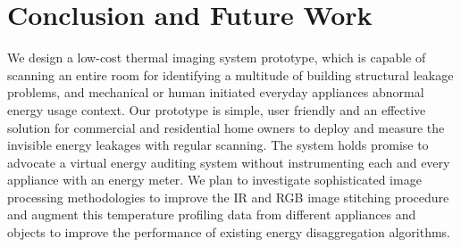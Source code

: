 \section{Conclusion and Future Work}
\label{sec:concl}

We design a low-cost thermal imaging system prototype, {\IRLeak}  which is capable of scanning an entire room for identifying a multitude of building structural leakage problems, and mechanical or human initiated everyday appliances abnormal energy usage context. Our prototype is simple, user friendly and an effective solution for commercial and residential home owners to deploy and measure the invisible energy leakages with regular scanning. The {\IRLeak} system holds promise to advocate a virtual energy auditing system without instrumenting each and every appliance with an energy meter. We plan to investigate sophisticated image processing methodologies to improve the IR and RGB image stitching procedure and augment this temperature profiling data from different appliances and objects to improve the performance of existing energy disaggregation algorithms.
